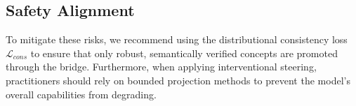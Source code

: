 \documentclass{article}
\begin{document}
\subsection{Safety Alignment}
To mitigate these risks, we recommend using the distributional consistency loss $\mathcal{L}_{cons}$ to ensure that only robust, semantically verified concepts are promoted through the bridge. Furthermore, when applying interventional steering, practitioners should rely on bounded projection methods to prevent the model's overall capabilities from degrading.
\end{document}
